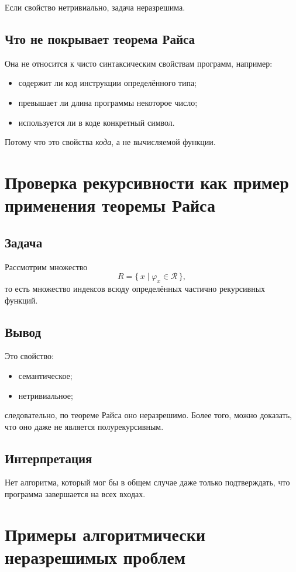 \documentclass[12pt,a4paper]{article}
\begin{document}
Если свойство нетривиально, задача неразрешима.

\subsection{Что не покрывает теорема Райса}
Она не относится к чисто синтаксическим свойствам программ, например:
\begin{itemize}
    \item содержит ли код инструкции определённого типа;
    \item превышает ли длина программы некоторое число;
    \item используется ли в коде конкретный символ.
\end{itemize}

Потому что это свойства \emph{кода}, а не вычисляемой функции.

\section{Проверка рекурсивности как пример применения теоремы Райса}

\subsection{Задача}
Рассмотрим множество
\[
R=\{\,x\mid \varphi_x\in\mathcal R\,\},
\]
то есть множество индексов всюду определённых частично рекурсивных функций.

\subsection{Вывод}
Это свойство:
\begin{itemize}
    \item семантическое;
    \item нетривиальное;
\end{itemize}
следовательно, по теореме Райса оно неразрешимо. Более того, можно доказать, что оно даже не является полурекурсивным.

\subsection{Интерпретация}
Нет алгоритма, который мог бы в общем случае даже только подтверждать, что программа завершается на всех входах.

\section{Примеры алгоритмически неразрешимых проблем}
\end{document}
